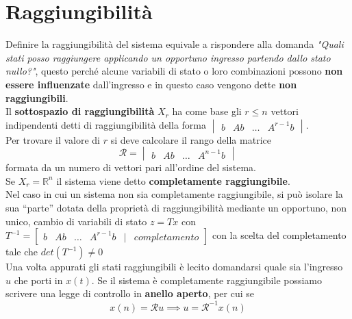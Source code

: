 \documentclass[a4paper]{article}
\begin{document}
	\section{Raggiungibilità}
	Definire la raggiungibilità del sistema equivale a rispondere alla domanda \emph{"Quali stati posso raggiungere applicando un opportuno ingresso partendo dallo stato nullo?"}, questo perché alcune variabili di stato o loro combinazioni possono \textbf{non essere influenzate} dall'ingresso e in questo caso vengono dette \textbf{non raggiungibili}.\newline\\
	Il \textbf{sottospazio di raggiungibilità} $X_r$ ha come base gli $r\le n$ vettori indipendenti detti di raggiungibilità della forma
	$\begin{vmatrix}
		b & Ab & \dots & A^{r-1}b
	\end{vmatrix}$.\\
	Per trovare il valore di $r$ si deve calcolare il rango della matrice \[\mathcal{R}=\begin{vmatrix}
	b & Ab & \dots & A^{n-1}b
	\end{vmatrix}\]
	formata da un numero di vettori pari all'ordine del sistema. \newline\\
	Se $X_r=\mathbb{R}^n$ il sistema viene detto \textbf{completamente raggiungibile}.\newline\\
	Nel caso in cui un sistema non sia completamente raggiungibile, si può isolare la sua “parte” dotata della proprietà di raggiungibilità mediante un opportuno, non unico, cambio di variabili di stato $z=Tx$ con 
	$T^{-1}=
	\begin{bmatrix}
	b & Ab & \dots & A^{r-1}b & | & completamento
	\end{bmatrix}$
	con la scelta del completamento tale che $det(T^{-1})\ne0$
	\newline \\
	Una volta appurati gli stati raggiungibili è lecito domandarsi quale sia l'ingresso $u$ che porti in $x(t)$. Se il sistema è completamente raggiungibile possiamo scrivere una legge di controllo in \textbf{anello aperto}, per cui se \[x(n)=\mathcal{R}u\implies u=\mathcal{R}^{-1}x(n)\]
\end{document}
